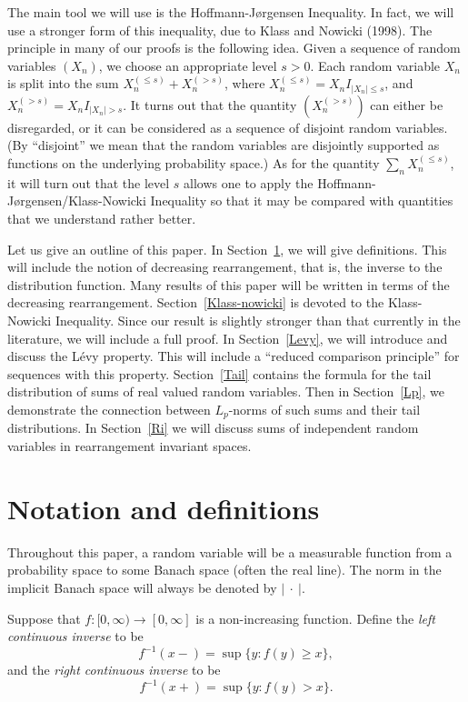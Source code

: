 \documentclass[12pt]{article}
\newcommand{\modo}[1]{{\left|#1\right|}}
\newcommand{\smodo}[1]{{\mathopen|#1\mathclose|}}
\begin{document}
The main tool we will use is the Hoffmann-J{\o}rgensen Inequality. In
fact, we will use a stronger form of this inequality, due to
Klass and Nowicki (1998).
The principle in many of our proofs is the following idea.  Given 
a sequence of random variables $(X_n)$, we choose an appropriate level 
$s>0$.  Each random variable $X_n$ is split into the 
sum $X^{(\le s)}_n + X^{(>s)}_n$, where $X^{(\le s)}_n = X_n
I_{\modo{X_n}\le 
s}$, and $X^{(>s)}_n = X_n I_{\modo{X_n} > s}$.  It turns out that the
quantity $(X_n^{(>s)})$ can either be disregarded, or it can be  
considered as a sequence of disjoint random variables. 
(By ``disjoint'' we mean that the random variables are disjointly
supported as functions on the underlying probability space.) As for the
quantity 
$\sum_n X_n^{(\le s)}$, it will turn out that the level $s$ allows one
to apply the Hoffmann-J{\o}rgensen/Klass-Nowicki Inequality so that it may 
be compared with
quantities that we understand rather better.

Let us give an outline of this paper.  In Section~\ref{Defins}, we will give
definitions. This will include the notion of decreasing rearrangement,
that is, the inverse to the distribution function.  Many results of
this paper will be written in terms of the decreasing rearrangement.
Section~\ref{Klass-nowicki} is devoted to the Klass-Nowicki Inequality.  
Since our result is
slightly stronger than that currently in the literature, we will
include a full proof. 
In Section~\ref{Levy}, we will introduce and discuss the
L\'evy property.  This will include a ``reduced comparison principle''
for sequences with this property. 
Section~\ref{Tail} contains the formula for the tail distribution of sums of
real
valued random variables. 
Then in Section~\ref{Lp}, we demonstrate the connection between $L_p$-norms 
of such sums and their tail distributions.
In Section~\ref{Ri} we will discuss sums of independent random variables in
rearrangement invariant spaces.

\section{Notation and definitions}
\label{Defins}

Throughout this paper, a random variable will be a measurable function
from a probability space to some Banach space (often the real
line). The norm in the implicit Banach space will always be denoted by
$\smodo{\ \cdot\ }$.

Suppose that $f:[0,\infty) \to [0,\infty]$ is a non-increasing
function.  Define the
{\em left continuous inverse\/} to be
$$ f^{-1}(x-) = \sup\{ y: f(y) \ge x \} ,$$
and the {\em right continuous inverse\/} to be
$$ f^{-1}(x+) = \sup\{ y: f(y) > x \} .$$
\end{document}
